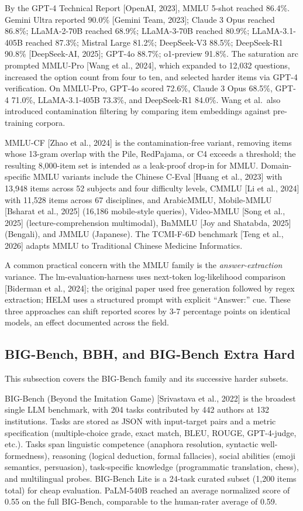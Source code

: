 By the GPT-4 Technical Report {[}OpenAI, 2023{]}, MMLU 5-shot reached 86.4\%. Gemini Ultra reported 90.0\% {[}Gemini Team, 2023{]}; Claude 3 Opus reached 86.8\%; LLaMA-2-70B reached 68.9\%; LLaMA-3-70B reached 80.9\%; LLaMA-3.1-405B reached 87.3\%; Mistral Large 81.2\%; DeepSeek-V3 88.5\%; DeepSeek-R1 90.8\% {[}DeepSeek-AI, 2025{]}; GPT-4o 88.7\%; o1-preview 91.8\%. The saturation arc prompted MMLU-Pro {[}Wang et al., 2024{]}, which expanded to 12,032 questions, increased the option count from four to ten, and selected harder items via GPT-4 verification. On MMLU-Pro, GPT-4o scored 72.6\%, Claude 3 Opus 68.5\%, GPT-4 71.0\%, LLaMA-3.1-405B 73.3\%, and DeepSeek-R1 84.0\%. Wang et al.~also introduced contamination filtering by comparing item embeddings against pre-training corpora.

MMLU-CF {[}Zhao et al., 2024{]} is the contamination-free variant, removing items whose 13-gram overlap with the Pile, RedPajama, or C4 exceeds a threshold; the resulting 8,000-item set is intended as a leak-proof drop-in for MMLU. Domain-specific MMLU variants include the Chinese C-Eval {[}Huang et al., 2023{]} with 13,948 items across 52 subjects and four difficulty levels, CMMLU {[}Li et al., 2024{]} with 11,528 items across 67 disciplines, and ArabicMMLU, Mobile-MMLU {[}Bsharat et al., 2025{]} (16,186 mobile-style queries), Video-MMLU {[}Song et al., 2025{]} (lecture-comprehension multimodal), BnMMLU {[}Joy and Shatabda, 2025{]} (Bengali), and JMMLU (Japanese). The TCMI-F-6D benchmark {[}Teng et al., 2026{]} adapts MMLU to Traditional Chinese Medicine Informatics.

A common practical concern with the MMLU family is the \emph{answer-extraction} variance. The lm-evaluation-harness uses next-token log-likelihood comparison {[}Biderman et al., 2024{]}; the original paper used free generation followed by regex extraction; HELM uses a structured prompt with explicit ``Answer:'' cue. These three approaches can shift reported scores by 3-7 percentage points on identical models, an effect documented across the field.

\subsection{BIG-Bench, BBH, and BIG-Bench Extra Hard}\label{big-bench-bbh-and-big-bench-extra-hard}

This subsection covers the BIG-Bench family and its successive harder subsets.

BIG-Bench (Beyond the Imitation Game) {[}Srivastava et al., 2022{]} is the broadest single LLM benchmark, with 204 tasks contributed by 442 authors at 132 institutions. Tasks are stored as JSON with input-target pairs and a metric specification (multiple-choice grade, exact match, BLEU, ROUGE, GPT-4-judge, etc.). Tasks span linguistic competence (anaphora resolution, syntactic well-formedness), reasoning (logical deduction, formal fallacies), social abilities (emoji semantics, persuasion), task-specific knowledge (programmatic translation, chess), and multilingual probes. BIG-Bench Lite is a 24-task curated subset (1,200 items total) for cheap evaluation. PaLM-540B reached an average normalized score of 0.55 on the full BIG-Bench, comparable to the human-rater average of 0.59.

